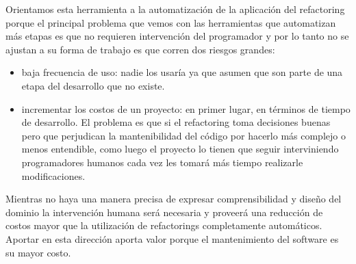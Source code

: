 \begin{description}
Orientamos esta herramienta a la automatización de la aplicación del refactoring
porque el principal problema que vemos con las herramientas que automatizan más
etapas es que no requieren intervención del programador y por lo tanto no se
ajustan a su forma de trabajo es que corren dos riesgos grandes:

\begin{itemize}
    \item baja frecuencia de uso: nadie los usaría ya que asumen que son parte
      de una etapa del desarrollo que no existe.
    \item incrementar los costos de un proyecto: en primer lugar, en términos de
      tiempo de desarrollo. El problema es que si el refactoring toma decisiones
      buenas pero que perjudican la mantenibilidad del código por hacerlo más
      complejo o menos entendible, como luego el proyecto lo tienen que seguir
      interviniendo programadores humanos cada vez les tomará más tiempo
      realizarle modificaciones.
\end{itemize}

Mientras no haya una manera precisa de expresar comprensibilidad y diseño del
dominio la intervención humana será necesaria y proveerá una reducción de costos
mayor que la utilización de
refactorings completamente automáticos. Aportar en esta dirección aporta valor
porque el mantenimiento del software es su mayor costo.



% 



\end{description}
